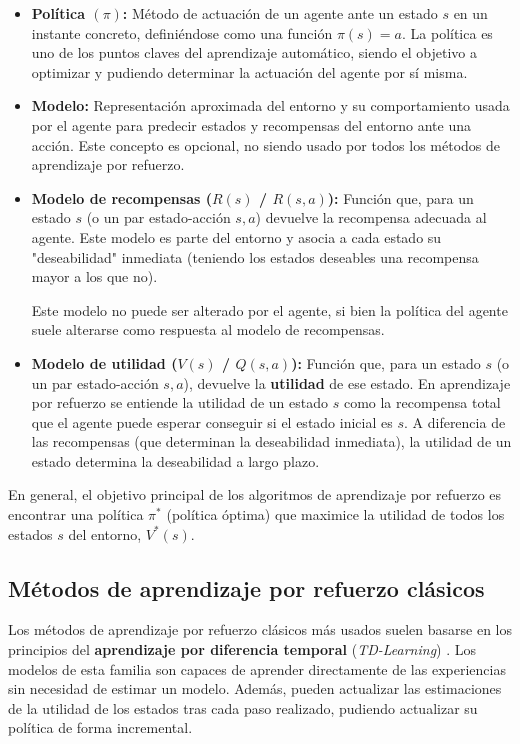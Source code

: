 \begin{itemize}
\item \textbf{Política $(\pi)$:} Método de actuación de un agente ante un estado $s$ en un instante concreto, definiéndose como una función $\pi(s) = a$. La política es uno de los puntos claves del aprendizaje automático, siendo el objetivo a optimizar y pudiendo determinar la actuación del agente por sí misma.
\item \textbf{Modelo:} Representación aproximada del entorno y su comportamiento usada por el agente para predecir estados y recompensas del entorno ante una acción. Este concepto es opcional, no siendo usado por todos los métodos de aprendizaje por refuerzo.
\item \textbf{Modelo de recompensas ($R(s)$ / $R(s,a)$):} Función que, para un estado $s$ (o un par estado-acción $s, a$) devuelve la recompensa adecuada al agente. Este modelo es parte del entorno y asocia a cada estado su "deseabilidad" inmediata (teniendo los estados deseables una recompensa mayor a los que no).

Este modelo no puede ser alterado por el agente, si bien la política del agente suele alterarse como respuesta al modelo de recompensas.

\item \textbf{Modelo de utilidad ($V(s)$ / $Q(s,a)$):} Función que, para un estado $s$ (o un par estado-acción $s,a$), devuelve la \textbf{utilidad} de ese estado. En aprendizaje por refuerzo se entiende la utilidad de un estado $s$ como la recompensa total que el agente puede esperar conseguir si el estado inicial es $s$. A diferencia de las recompensas (que determinan la deseabilidad inmediata), la utilidad de un estado determina la deseabilidad a largo plazo.
\end{itemize}

En general, el objetivo principal de los algoritmos de aprendizaje por refuerzo es encontrar una política $\pi^*$ (política óptima) que maximice la utilidad de todos los estados $s$ del entorno, $V^*(s)$.

\subsection{Métodos de aprendizaje por refuerzo clásicos}

Los métodos de aprendizaje por refuerzo clásicos más usados suelen basarse en los principios del \textbf{aprendizaje por diferencia temporal} (\textit{TD-Learning}) \cite{Sutton1998}. Los modelos de esta familia son capaces de aprender directamente de las experiencias sin necesidad de estimar un modelo. Además, pueden actualizar las estimaciones de la utilidad de los estados tras cada paso realizado, pudiendo actualizar su política de forma incremental.

